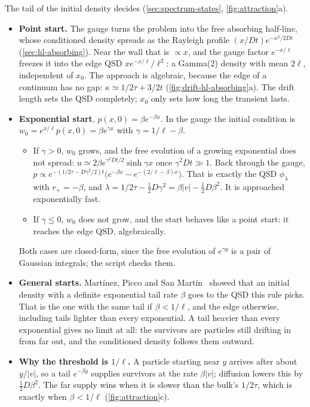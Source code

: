 \documentclass[11pt]{article}
\numberwithin{equation}{section}
\begin{document}
The tail of the initial density decides (\cref{sec:spectrum-states}, \cref{fig:attraction}a).
\begin{itemize}
  \item \textbf{Point start.} The gauge turns the problem into the free absorbing half-line, whose conditioned
        density spreads as the Rayleigh profile $(x/Dt)e^{-x^2/2Dt}$ (\cref{sec:hl-absorbing}). Near the wall
        that is $\propto x$, and the gauge factor $e^{-x/\ell}$ freezes it into the edge QSD
        $xe^{-x/\ell}/\ell^2$: a Gamma(2) density with mean $2\ell$, independent of $x_0$. The approach is
        algebraic, because the edge of a continuum has no gap: $\kappa\simeq1/2\tau+3/2t$
        (\cref{fig:drift-hl-absorbing}a). The drift length sets the QSD completely; $x_0$ only sets how long the
        transient lasts.
  \item \textbf{Exponential start}, $p(x,0)=\beta e^{-\beta x}$. In the gauge the initial condition is
        $w_0=e^{x/\ell}p(x,0)=\beta e^{\gamma x}$ with $\gamma=1/\ell-\beta$.
        \begin{itemize}
          \item If $\gamma>0$, $w_0$ grows, and the free evolution of a growing exponential does not spread:
                $u\simeq2\beta e^{\gamma^2Dt/2}\sinh\gamma x$ once $\gamma^2Dt\gg1$. Back through the gauge,
                $p\propto e^{-(1/2\tau-D\gamma^2/2)t}\bigl(e^{-\beta x}-e^{-(2/\ell-\beta)x}\bigr)$. That is
                exactly the QSD $\phi_\lambda$ with $r_+=-\beta$, and
                $\lambda=1/2\tau-\tfrac12D\gamma^2=\beta|v|-\tfrac12D\beta^2$. It is approached exponentially
                fast.
          \item If $\gamma\le0$, $w_0$ does not grow, and the start behaves like a point start: it reaches the
                edge QSD, algebraically.
        \end{itemize}
        Both cases are closed-form, since the free evolution of $e^{\gamma y}$ is a pair of Gaussian integrals;
        the script checks them.
  \item \textbf{General starts.} Mart\'inez, Picco and San Mart\'in~\cite{martinez} showed that an initial
        density with a definite exponential tail rate $\beta$ goes to the QSD this rule picks. That is the one
        with the same tail if $\beta<1/\ell$, and the edge otherwise, including tails lighter than every
        exponential. A tail heavier than every exponential gives no limit at all: the survivors are particles
        still drifting in from far out, and the conditioned density follows them outward.
  \item \textbf{Why the threshold is $1/\ell$.} A particle starting near $y$ arrives after about $y/|v|$, so a
        tail $e^{-\beta y}$ supplies survivors at the rate $\beta|v|$; diffusion lowers this by
        $\tfrac12D\beta^2$. The far supply wins when it is slower than the bulk's $1/2\tau$, which is exactly
        when $\beta<1/\ell$ (\cref{fig:attraction}c).
\end{itemize}
\end{document}

